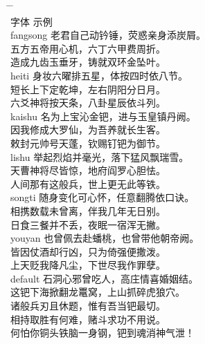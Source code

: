 \begin{tabbing}
\hspace{20mm} \= \hspace{20mm} \= \hspace{80mm} \kill\\
 \> 字体      \>  \hspace{26mm} 示例 \\
 \> fangsong \> \fangsong 老君自己动钤锤，荧惑亲身添炭屑。 \\
 \>          \> \fangsong 五方五帝用心机，六丁六甲费周折。 \\
 \>          \> \fangsong 造成九齿玉垂牙，铸就双环金坠叶。 \\
 \> heiti    \> \heiti 身妆六曜排五星，体按四时依八节。 \\
 \>          \> \heiti 短长上下定乾坤，左右阴阳分日月。 \\
 \>          \> \heiti 六爻神将按天条，八卦星辰依斗列。 \\
 \> kaishu    \> \kaishu 名为上宝沁金钯，进与玉皇镇丹阙。 \\
 \>          \> \kaishu 因我修成大罗仙，为吾养就长生客。 \\
 \>          \> \kaishu 敕封元帅号天蓬，钦赐钉钯为御节。 \\
 \> lishu    \> \kaishu 举起烈焰并毫光，落下猛风飘瑞雪。 \\
 \>          \> \kaishu 天曹神将尽皆惊，地府阎罗心胆怯。 \\
 \>          \> \kaishu 人间那有这般兵，世上更无此等铁。 \\
 \> songti   \> \songti 随身变化可心怀，任意翻腾依口诀。 \\
 \>          \> \songti 相携数载未曾离，伴我几年无日别。 \\
 \>          \> \songti 日食三餐并不丢，夜眠一宿浑无撇。 \\
 \> youyan    \> \kaishu 也曾佩去赴蟠桃，也曾带他朝帝阙。 \\
 \>          \> \kaishu 皆因仗酒却行凶，只为倚强便撒泼。 \\
 \>          \> \kaishu 上天贬我降凡尘，下世尽我作罪孽。 \\
 \> default  \> 石洞心邪曾吃人，高庄情喜婚姻结。 \\
 \>          \> 这钯下海掀翻龙鼍窝，上山抓碎虎狼穴。 \\
 \>          \> 诸般兵刃且休题，惟有吾当钯最切。 \\
 \>          \> 相持取胜有何难，赌斗求功不用说。 \\
 \>          \> 何怕你铜头铁脑一身钢，钯到魂消神气泄！
\end{tabbing}

